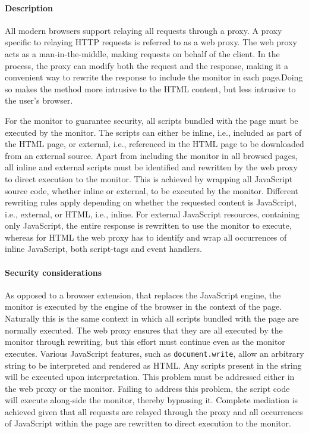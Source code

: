 \documentclass{llncs}
\newcommand{\todo}[1]{\colorbox{red}{\textcolor{white}{\sffamily\bfseries\scriptsize TODO}} \textcolor{red}{#1} \textcolor{red}{$\blacktriangleleft$}}
\begin{document}
\paragraph{Description}
All modern browsers support %
relaying all requests through a proxy.
A proxy specific to relaying HTTP requests is referred to as a web proxy.
The web proxy acts as a man-in-the-middle, making 
requests on behalf of the client. 
In the process, the proxy can
modify both the request and the response, making it 
a convenient way to rewrite the response to include 
the monitor in each page.Doing so makes the method more 
intrusive to the HTML content, but less intrusive to the user's browser. 

For the monitor to guarantee security, all scripts bundled with 
the page must be executed by the monitor. The scripts can either be inline, 
i.e., included as part of the HTML page, or external, i.e., referenced in the 
HTML page to be downloaded from an external source.
Apart from including the monitor in all browsed pages, all inline and external 
scripts must be identified and rewritten by the web proxy to direct execution to the monitor.
This is achieved by wrapping all JavaScript source code, whether inline or 
external, to be executed by the monitor.
Different rewriting rules apply depending on whether the 
requested content is JavaScript, i.e., external, or HTML, i.e., inline. 
For external 
JavaScript resources, containing only JavaScript, the entire response is rewritten to use the monitor to execute, whereas 
for HTML the web proxy has to identify and wrap all occurrences of inline 
JavaScript, both script-tags and event handlers.


\paragraph{Security considerations}

As opposed to a browser extension, that replaces the 
JavaScript engine, the monitor is executed by the engine of the browser in the context of the page. Naturally 
this is the same context in which all scripts bundled with the 
page are normally executed. 
The web proxy ensures that they are all executed by
the monitor through rewriting, but this effort must continue even as the monitor executes. 
Various JavaScript features, such as 
\lstinline{document.write}, allow an arbitrary string to be 
interpreted and rendered as HTML. Any scripts present in the string will be 
executed upon interpretation. This problem must be addressed either in the web proxy or the monitor. Failing to address this problem, the script code will execute 
along-side the monitor, thereby bypassing it. 
Complete mediation is achieved given that all requests are relayed through the proxy 
and all occurrences of JavaScript within the page are rewritten to direct execution to the monitor.
\end{document}
